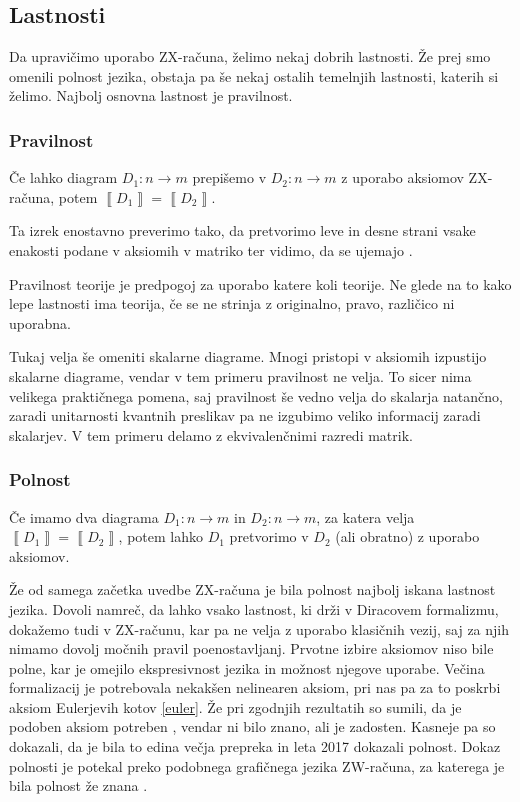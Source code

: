 \documentclass[mat1]{fmfdelo}
\newcommand{\interpret}[1]{\left\llbracket #1 \right\rrbracket}
\begin{document}
\subsection{Lastnosti}
Da upravičimo uporabo ZX-računa, želimo nekaj dobrih lastnosti. Že prej smo omenili polnost jezika, obstaja pa še nekaj ostalih temelnjih lastnosti, katerih si želimo. Najbolj osnovna lastnost je pravilnost.
\subsubsection{Pravilnost}
\begin{izrek}[Pravilnost]
    Če lahko diagram \(D_1:n\to m\) prepišemo v \(D_2:n\to m\) z uporabo aksiomov ZX-računa, potem \(\interpret{D_1} = \interpret{D_2}\).
\end{izrek}
Ta izrek enostavno preverimo tako, da pretvorimo leve in desne strani vsake enakosti podane v aksiomih v matriko ter vidimo, da se ujemajo \cite[izrek 2.16]{Coecke_2011}.

Pravilnost teorije je predpogoj za uporabo katere koli teorije. Ne glede na to kako lepe lastnosti ima teorija, če se ne strinja z originalno, pravo, različico ni uporabna.

Tukaj velja še omeniti skalarne diagrame. Mnogi pristopi v aksiomih izpustijo skalarne diagrame, vendar v tem primeru pravilnost ne velja. To sicer nima velikega praktičnega pomena, saj pravilnost še vedno velja do skalarja natančno, zaradi unitarnosti kvantnih preslikav pa ne izgubimo veliko informacij zaradi skalarjev. V tem primeru delamo z ekvivalenčnimi razredi matrik.
\subsubsection{Polnost}
\begin{izrek}[Polnost]
    Če imamo dva diagrama \(D_1:n\to m\) in \(D_2:n\to m\), za katera velja \(\interpret{D_1} = \interpret{D_2}\), potem lahko \(D_1\) pretvorimo v \(D_2\) (ali obratno) z uporabo aksiomov.
\end{izrek}
Že od samega začetka uvedbe ZX-računa je bila polnost najbolj iskana lastnost jezika. Dovoli namreč, da lahko vsako lastnost, ki drži v Diracovem formalizmu, dokažemo tudi v ZX-računu, kar pa ne velja z uporabo klasičnih vezij, saj za njih nimamo dovolj močnih pravil poenostavljanj. Prvotne izbire aksiomov niso bile polne, kar je omejilo ekspresivnost jezika in možnost njegove uporabe. Večina formalizacij je potrebovala nekakšen nelinearen aksiom, pri nas pa za to poskrbi aksiom Eulerjevih kotov \ref{euler}. Že pri zgodnjih rezultatih so sumili, da je podoben aksiom potreben \cite{Schr_der_de_Witt_2014}, vendar ni bilo znano, ali je zadosten. Kasneje pa so dokazali, da je bila to edina večja prepreka in leta 2017 dokazali polnost. Dokaz polnosti je potekal preko podobnega grafičnega jezika ZW-računa, za katerega je bila polnost že znana \cite{kangfengng}.
\end{document}
